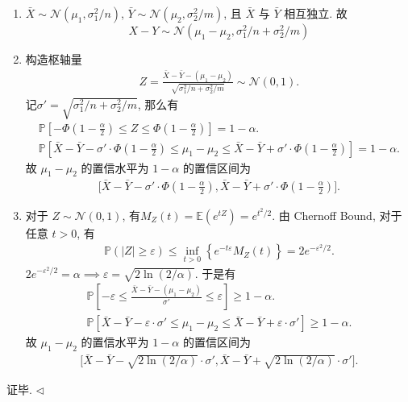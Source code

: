\documentclass[11pt]{article}
\newenvironment{answer}[1][Solution]{\begin{trivlist}
    \item[\hskip \labelsep {\bfseries #1.}\hskip \labelsep]}{\hfill$\lhd$\end{trivlist}}
\newcommand\1{\mathds{1}}
\newcommand\E{\mathbb{E}}
\newcommand\PP{\mathbb{P}}
\begin{document}
\begin{answer}
    \begin{enumerate}[label = (\arabic*)]
        \item $\bar{X} \sim \mathcal{N}(\mu_1, \sigma_1^2/n)$, $\bar{Y} \sim \mathcal{N}(\mu_2, \sigma_2^2/m)$, 且 $\bar{X}$ 与 $\bar{Y}$ 相互独立. 故 
        \[
            X - Y \sim \mathcal{N}(\mu_1 - \mu_2, \sigma_1^2/n + \sigma_2^2/m)
        \]
        \item 构造枢轴量
        \begin{align*}
            Z = \frac{\bar{X} - \bar{Y} - (\mu_1 - \mu_2)}{\sqrt{\sigma_1^2/n + \sigma_2^2/m}} \sim \mathcal{N}(0, 1).
        \end{align*}
        记$\sigma' = \sqrt{\sigma_1^2/n + \sigma_2^2/m}$, 那么有
        \begin{gather*}
            \PP\left[-\Phi\left(1-\frac{\alpha}{2}\right) \le Z \le \Phi\left(1-\frac{\alpha}{2}\right)\right] = 1 - \alpha. \\
            \PP\left[\bar{X} - \bar{Y} - \sigma'\cdot \Phi\left(1-\frac{\alpha}{2}\right) \le \mu_1 - \mu_2 \le \bar{X} - \bar{Y} + \sigma' \cdot \Phi\left(1-\frac{\alpha}{2}\right)\right] = 1 - \alpha.
        \end{gather*}
        故 $\mu_1 - \mu_2$ 的置信水平为 $1-\alpha$ 的置信区间为
        \begin{align*}
            \bigg[\bar{X} - \bar{Y} - \sigma' \cdot \Phi\left(1-\frac{\alpha}{2}\right), \bar{X} - \bar{Y} + \sigma' \cdot \Phi\left(1-\frac{\alpha}{2}\right)\bigg].
        \end{align*}
        \item 对于 $Z \sim \mathcal{N}(0,1)$, 有$M_Z(t) = \E(e^{tZ}) = e^{t^2/2}$. 由 Chernoff Bound, 对于任意 $t > 0$, 有
        \begin{align*}
            \PP(|Z| \ge \varepsilon) \le \inf_{t > 0} \left\{e^{-t\varepsilon}M_Z(t)\right\} = 2e^{-\varepsilon^2/2}.
        \end{align*}
        $2e^{-\varepsilon^2/2} = \alpha \implies \varepsilon = \sqrt{2\ln(2/\alpha)}$. 于是有
        \begin{gather*}
            \PP\left[-\varepsilon \le \frac{\bar{X}-\bar{Y}-(\mu_1-\mu_2)}{\sigma'} \le \varepsilon\right] \ge 1 - \alpha. \\
            \PP\left[\bar{X} - \bar{Y} - \varepsilon \cdot \sigma' \le \mu_1 - \mu_2 \le \bar{X} - \bar{Y} + \varepsilon \cdot \sigma'\right] \ge 1 - \alpha.
        \end{gather*}
        故 $\mu_1 - \mu_2$ 的置信水平为 $1-\alpha$ 的置信区间为
        \begin{align*}
            \bigg[\bar{X} - \bar{Y} - \sqrt{2\ln(2/\alpha)} \cdot \sigma', \bar{X} - \bar{Y} + \sqrt{2\ln(2/\alpha)} \cdot \sigma'\bigg].
        \end{align*}
    \end{enumerate}
    证毕.
\end{answer}
\end{document}
